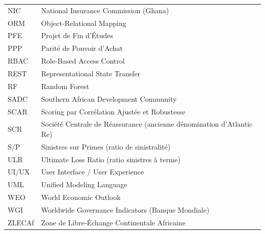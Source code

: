 \documentclass[../main.tex]{subfiles}
\begin{document}
\begin{center}
\begin{tabular}{@{}p{3cm}p{11.5cm}@{}}
NIC     & National Insurance Commission (Ghana) \\
ORM     & Object-Relational Mapping \\
PFE     & Projet de Fin d'Études \\
PPP     & Parité de Pouvoir d'Achat \\
RBAC    & Role-Based Access Control \\
REST    & Representational State Transfer \\
RF      & Random Forest \\
SADC    & Southern African Development Community \\
SCAR    & Scoring par Corrélation Ajustée et Robustesse \\
SCR     & Société Centrale de Réassurance (ancienne dénomination d'Atlantic Re) \\
S/P     & Sinistres sur Primes (ratio de sinistralité) \\
ULR     & Ultimate Loss Ratio (ratio sinistres à terme) \\
UI/UX   & User Interface / User Experience \\
UML     & Unified Modeling Language \\
WEO     & World Economic Outlook \\
WGI     & Worldwide Governance Indicators (Banque Mondiale) \\
ZLECAf  & Zone de Libre-Échange Continentale Africaine \\
\bottomrule
\end{tabular}
\end{center}
\clearpage

\setcounter{page}{1}

\end{document}
